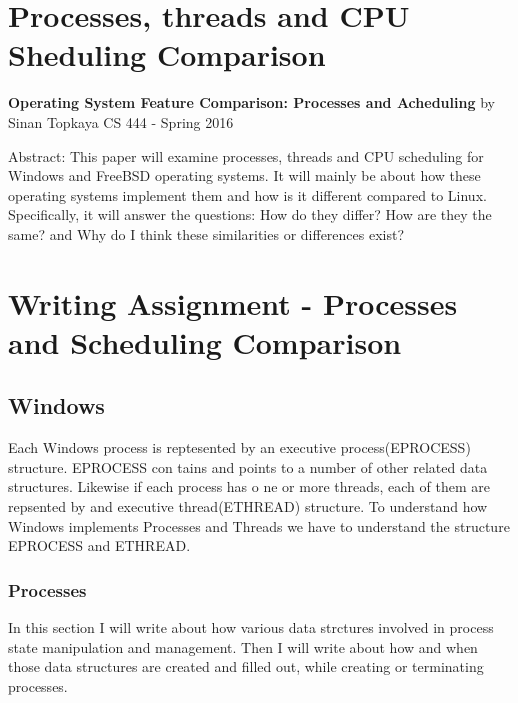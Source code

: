 \documentclass[letterpaper,10pt,draftclsnofoot,onecolumn]{IEEEtran}
\begin{document}
\appendix
\section{Processes, threads and CPU Sheduling Comparison}\label{AppendixA}
\begin{titlepage}
		
		\begin{center}
		\bigbreak	
		\textbf{Operating System Feature Comparison: Processes and Acheduling}
		\bigbreak
		by Sinan Topkaya
		\smallbreak
		CS 444 - Spring 2016
		\end{center}
		\vfill
		
		Abstract: This paper will examine processes, threads and CPU scheduling for Windows and FreeBSD operating systems. It will mainly be about how these operating systems implement them and how is it different compared to Linux. Specifically, it will answer the questions: How do they differ? How are they the same? and Why do I think these similarities or differences exist?
		
	\end{titlepage}

\section*{Writing Assignment - Processes and Scheduling Comparison}

\subsection*{Windows}

Each Windows process is reptesented by an executive process(EPROCESS) structure. EPROCESS con
tains and points to a number of other related data structures. Likewise if each process has o
ne or more threads, each of them are repsented by and executive thread(ETHREAD) structure. To understand how Windows implements Processes and Threads we have to understand the structure EPROCESS and ETHREAD. 

\subsubsection*{Processes}

In this section I will write about how various data strctures involved in process state manipulation and management. Then I will write about how and when those data structures are created and filled out, while creating or terminating processes.\\
\end{document}
